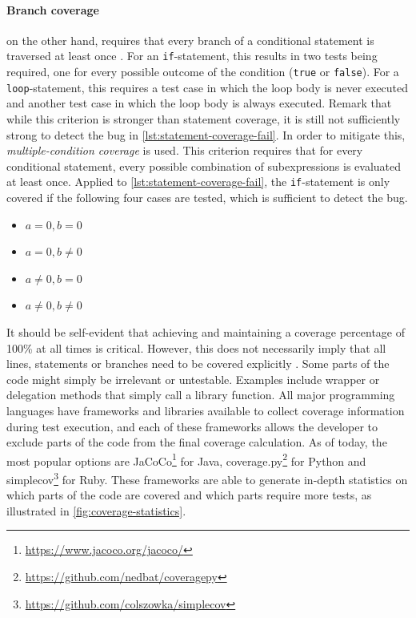\paragraph*{Branch coverage} on the other hand, requires that every branch of a conditional statement is traversed at least once \cite[p.~37]{Myers:2011:AST:2161638}. For an \texttt{if}-statement, this results in two tests being required, one for every possible outcome of the condition (\texttt{true} or \texttt{false}). For a \texttt{loop}-statement, this requires a test case in which the loop body is never executed and another test case in which the loop body is always executed. Remark that while this criterion is stronger than statement coverage, it is still not sufficiently strong to detect the bug in \autoref{lst:statement-coverage-fail}. In order to mitigate this, \emph{multiple-condition coverage} \cite[p.~40]{Myers:2011:AST:2161638} is used. This criterion requires that for every conditional statement, every possible combination of subexpressions is evaluated at least once. Applied to \autoref{lst:statement-coverage-fail}, the \texttt{if}-statement is only covered if the following four cases are tested, which is sufficient to detect the bug.
\begin{itemize}
	\item $a = 0, b = 0$
	\item $a = 0, b \neq 0$
	\item $a \neq 0, b = 0$
	\item $a \neq 0, b \neq 0$
\end{itemize}

\noindent It should be self-evident that achieving and maintaining a coverage percentage of 100\% at all times is critical. However, this does not necessarily imply that all lines, statements or branches need to be covered explicitly \cite{dein_2019}. Some parts of the code might simply be irrelevant or untestable. Examples include wrapper or delegation methods that simply call a library function. All major programming languages have frameworks and libraries available to collect coverage information during test execution, and each of these frameworks allows the developer to exclude parts of the code from the final coverage calculation. As of today, the most popular options are JaCoCo\footnote{\url{https://www.jacoco.org/jacoco/}} for Java, coverage.py\footnote{\url{https://github.com/nedbat/coveragepy}} for Python and simplecov\footnote{\url{https://github.com/colszowka/simplecov}} for Ruby. These frameworks are able to generate in-depth statistics on which parts of the code are covered and which parts require more tests, as illustrated in \autoref{fig:coverage-statistics}.


